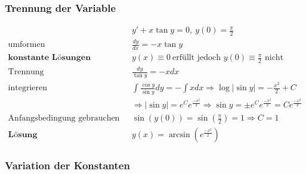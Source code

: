 \subsubsection{Trennung der Variable}

\begin{equation*}
\begin{split}
& y' + x \tan y = 0,\ y(0) = \frac{\pi}{2} \\
\text{umformen}\quad & \frac{dy}{dx} = -x \tan y \\
\textbf{konstante L{\"o}sungen}\quad & y(x) \equiv 0\ \text{erf{\"u}llt jedoch $y(0) \equiv \frac{\pi}{2}$ nicht} \\
\text{Trennung}\quad & \frac{dy}{\tan y} = -x dx \\
\text{integrieren}\quad & \int\frac{\cos y}{\sin y}dy = - \int xdx \Rightarrow \log|\sin y| = -\frac{x^2}{2} + C \\
& \Rightarrow |\sin y| = e^Ce^{\frac{-x^2}{2}} \Rightarrow \sin y = \pm e^Ce^{\frac{-x^2}{2}} = Ce^{\frac{-x^2}{2}} \\
\text{Anfangsbedingung gebrauchen}\quad & \sin(y(0)) = \sin (\frac{\pi}{2}) = 1 \Rightarrow C = 1 \\
\textbf{L{\"o}sung}\quad & y(x) = \arcsin (e^{\frac{-x^2}{2}})
\end{split}
\end{equation*}



\subsubsection{Variation der Konstanten}

